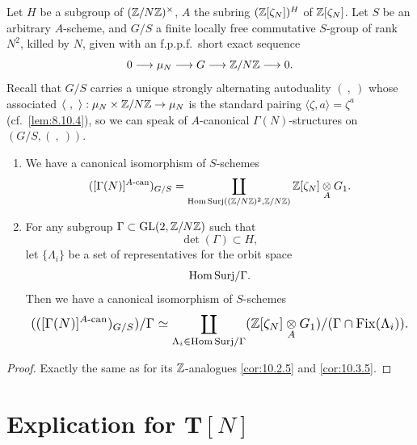 \begin{kthm}\label{thm:10.4.3}
Let $H$ be a subgroup of $(\mathbb{Z}/N\mathbb{Z})^\times$, $A$ the subring $(\mathbb{Z}[\zeta_N])^H$ of $\mathbb{Z}[\zeta_N]$. Let $S$ be an arbitrary $A$-scheme, and $G/S$ a finite locally free commutative $S$-group of rank $N^2$, killed by $N$, given with an f.p.p.f.\ short exact sequence
\[
0 \longrightarrow \mu_N \longrightarrow G \longrightarrow \mathbb{Z}/N\mathbb{Z} \longrightarrow 0 .
\]
Recall that $G/S$ carries a unique strongly alternating autoduality $(\ ,\ )$ whose associated $\langle\ ,\ \rangle : \mu_N \times \mathbb{Z}/N\mathbb{Z} \to \mu_N$ is the standard pairing $\langle \zeta, a \rangle = \zeta^a$ (cf.~\ref{lem:8.10.4}), so we can speak of $A$-canonical $\Gamma(N)$-structures on $(G/S, (\ ,\ ))$.
\begin{enumerate}[label=(\arabic*)]
\item We have a canonical isomorphism of $S$-schemes
\[
([\Gamma(N)]^{A\text{-can}})_{G/S} = \coprod_{\mathrm{Hom\,Surj}((\mathbb{Z}/N\mathbb{Z})^2, \mathbb{Z}/N\mathbb{Z})} \mathbb{Z}[\zeta_N] \underset{A}{\otimes} G_1 .
\]
\item For any subgroup $\Gamma \subset \operatorname{GL}(2,\mathbb{Z}/N\mathbb{Z})$ such that
\[
\det(\Gamma) \subset H ,
\]
let $\{\Lambda_i\}$ be a set of representatives for the orbit space
\[
\mathrm{Hom\,Surj}/\Gamma .
\]
Then we have a canonical isomorphism of $S$-schemes
\[
\resizebox{0.97\linewidth}{!}{$\displaystyle
(([\Gamma(N)]^{A\text{-can}})_{G/S})/\Gamma \simeq \coprod_{\Lambda_i \in \HomSurj/\Gamma} (\Z[\zeta_N] \tens{A} G_1)/(\Gamma \cap \Fix(\Lambda_i)) .
$}
\]
\end{enumerate}
\end{kthm}

\begin{proof}
Exactly the same as for its $\mathbb{Z}$-analogues \eqref{cor:10.2.5} and \eqref{cor:10.3.5}.
\end{proof}


\section{Explication for $\mathbf{T}[N]$}
\label{sec:10.5}

